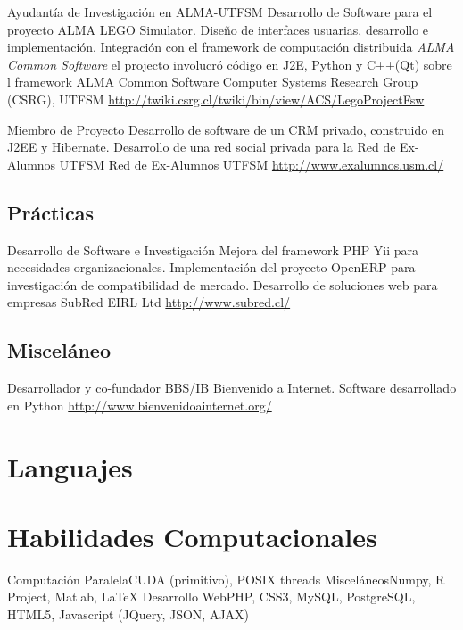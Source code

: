 \documentclass[11pt,a4paper]{moderncv}
\begin{document}
        {Ayudantía de Investigación en ALMA-UTFSM}
        {Desarrollo de Software para el proyecto ALMA LEGO Simulator. Diseño de interfaces usuarias, desarrollo e implementación. Integración con el framework de computación distribuida \emph{ALMA Common Software}}
        {el projecto involucró código en J2E, Python y C++(Qt) sobre l framework ALMA Common Software}
        {Computer Systems Research Group (CSRG), UTFSM}
        {\url{http://twiki.csrg.cl/twiki/bin/view/ACS/LegoProjectFsw}}
        
        {Miembro de Proyecto}
        {Desarrollo de software de un CRM privado, construido en J2EE y Hibernate. Desarrollo de una red social privada para la Red de Ex-Alumnos UTFSM}
        {Red de Ex-Alumnos UTFSM}
        {}
        {\url{http://www.exalumnos.usm.cl/}}
        
        
\subsection{Prácticas}


        {Desarrollo de Software e Investigación}
        {Mejora del framework PHP Yii para necesidades organizacionales. Implementación del proyecto OpenERP para investigación de compatibilidad de mercado. Desarrollo de soluciones web para empresas}
        {SubRed EIRL Ltd}
        {}
        {\url{http://www.subred.cl/}}
        
        
\subsection{Misceláneo}


        {Desarrollador y co-fundador}
        {BBS/IB Bienvenido a Internet. Software desarrollado en Python}
        {}
        {}
        {\url{http://www.bienvenidoainternet.org/}}
        
\section{Languajes}

\section{Habilidades Computacionales}
           {Computación Paralela}{CUDA (primitivo), POSIX threads}
           {Misceláneos}{Numpy, R Project, Matlab, \LaTeX}
           {Desarrollo Web}{PHP, CSS3, MySQL, PostgreSQL, HTML5, Javascript (JQuery, JSON, AJAX)}
\end{document}
